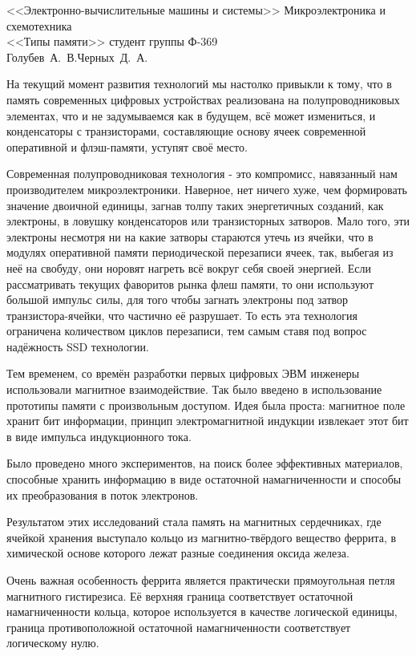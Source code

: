 



{<<Электронно-вычислительные машины и системы>>}
{Микроэлектроника и схемотехника \\ <<Типы памяти>>}
{студент группы Ф-369\\Голубев~А.~В.}{Черных~Д.~А.}{}

На текущий момент развития технологий мы настолко привыкли к тому, что в 
память современных цифровых устройствах реализована на полупроводниковых 
элементах, что и не задумываемся как в будущем, всё может измениться, и 
конденсаторы с транзисторами, составляющие основу ячеек современной 
оперативной и флэш-памяти, уступят своё место. 

Современная полупроводниковая технология - это компромисс, навязанный нам 
производителем микроэлектроники. Наверное, нет ничего хуже, чем формировать 
значение двоичной единицы, загнав толпу таких энергетичных созданий, как 
электроны, в ловушку конденсаторов или транзисторных затворов. Мало того, 
эти электроны несмотря ни на какие затворы стараются утечь из ячейки, что 
в модулях оперативной памяти периодической перезаписи ячеек, так, выбегая 
из неё на свобуду, они норовят нагреть всё вокруг себя своей энергией. 
Если рассматривать текущих фаворитов рынка флеш памяти, то они используют 
большой импульс силы, для того чтобы загнать электроны под затвор 
транзистора-ячейки, что частично её разрушает. То есть эта технология 
ограничена количеством циклов перезаписи, тем самым ставя под вопрос 
надёжность SSD технологии.

Тем временем, со времён разработки первых цифровых ЭВМ инженеры 
использовали магнитное взаимодействие. Так было введено в использование 
прототипы памяти с произвольным доступом. Идея была проста: магнитное поле 
хранит бит информации, принцип электромагнитной индукции извлекает этот 
бит в виде импульса индукционного тока. 

Было проведено много экспериментов, на поиск более эффективных 
материалов, способные хранить информацию в виде остаточной намагниченности 
и способы их преобразования в поток электронов.

Результатом этих исследований стала память на магнитных сердечниках, где 
ячейкой хранения выступало кольцо из магнитно-твёрдого вещество феррита, в 
химической основе которого лежат разные соединения оксида железа.

Очень важная особенность феррита является практически прямоугольная 
петля магнитного гистирезиса. Её верхняя граница соответствует остаточной 
намагниченности кольца, которое используется в качестве логической 
единицы, граница противоположной остаточной намагниченности соответствует 
логическому нулю. 

